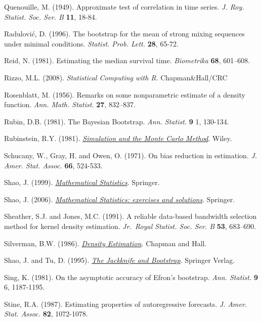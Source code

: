 \documentclass[
]{book}
\theoremstyle{break}
\theoremstyle{definition}
\theoremstyle{definition}
\theoremstyle{definition}
\theoremstyle{definition}
\theoremstyle{remark}
\begin{document}
Quenouille, M. (1949). Approximate test of correlation in time series.
\emph{J. Roy. Statist. Soc. Ser. B} \textbf{11}, 18-84.

Radulović, D. (1996). The bootstrap for the mean of strong mixing
sequences under minimal conditions. \emph{Statist. Prob. Lett.} \textbf{28},
65-72.

Reid, N. (1981). Estimating the median survival time. \emph{Biometrika}
\textbf{68}, 601--608.

Rizzo, M.L. (2008). \emph{Statistical Computing with R}. Chapman\&Hall/CRC

Rosenblatt, M. (1956). Remarks on some nonparametric estimate of a
density function. \emph{Ann. Math. Statist.} \textbf{27}, 832--837.

Rubin, D.B. (1981). The Bayesian Bootstrap. \emph{Ann. Statist.} \textbf{9} 1,
130-134.

Rubinstein, R.Y. (1981). \href{https://books.google.es/books?hl=es\&lr=\&id=r2VODQAAQBAJ\&oi=fnd\&pg=PR1\&dq=Simulation+and+the+Monte+Carlo+Method}{\emph{Simulation and the Monte Carlo Method}}. Wiley.

Schucany, W., Gray, H. and Owen, O. (1971). On bias reduction in
estimation. \emph{J. Amer. Stat. Assoc.} \textbf{66}, 524-533.

Shao, J. (1999). \href{https://www.springer.com/gp/book/9780387953823}{\emph{Mathematical Statistics}}. Springer.

Shao, J. (2006). \href{http://www.stewartschultz.com/statistics/books/Mathematical\%20Statistics\%20-\%20Exercises\%20and\%20Solutions.pdf}{\emph{Mathematical Statistics: exercises and solutions}}. Springer.

Sheather, S.J. and Jones, M.C. (1991). A reliable data-based bandwidth
selection method for kernel density estimation.
\emph{Jr.~Royal Statist. Soc. Ser. B} \textbf{53}, 683--690.

Silverman, B.W. (1986). \href{http://users.stat.ufl.edu/~rrandles/sta6934/smhandout.pdf}{\emph{Density Estimation}}. Chapman and Hall.

Shao, J. and Tu, D. (1995). \href{https://books.google.es/books?hl=es\&lr=\&id=VO3SBwAAQBAJ\&oi=fnd\&pg=PA1\&dq=The+Jackknife+and+Bootstrap}{\emph{The Jackknife and Bootstrap}}. Springer Verlag.

Sing, K. (1981). On the asymptotic accuracy of Efron's bootstrap.
\emph{Ann. Statist.} \textbf{9} 6, 1187-1195.

Stine, R.A. (1987). Estimating properties of autoregressive forecasts.
\emph{J. Amer. Stat. Assoc.} \textbf{82}, 1072-1078.
\end{document}

